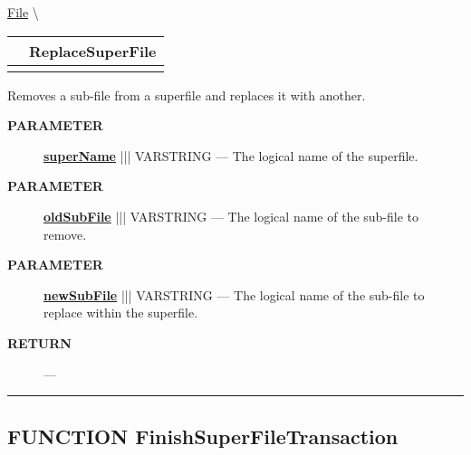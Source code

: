 \hypertarget{ecldoc:file.replacesuperfile}{}
\hspace{0pt} \hyperlink{ecldoc:File}{File} \textbackslash 

{\renewcommand{\arraystretch}{1.5}
\begin{tabularx}{\textwidth}{|>{\raggedright\arraybackslash}l|X|}
\hline
\hspace{0pt}\mytexttt{\color{red} } & \textbf{ReplaceSuperFile} \\
\hline
\multicolumn{2}{|>{\raggedright\arraybackslash}X|}{\hspace{0pt}\mytexttt{\color{param} (varstring superName, varstring oldSubFile, varstring newSubFile)}} \\
\hline
\end{tabularx}
}

\par





Removes a sub-file from a superfile and replaces it with another.






\par
\begin{description}
\item [\colorbox{tagtype}{\color{white} \textbf{\textsf{PARAMETER}}}] \textbf{\underline{superName}} ||| VARSTRING --- The logical name of the superfile.
\item [\colorbox{tagtype}{\color{white} \textbf{\textsf{PARAMETER}}}] \textbf{\underline{oldSubFile}} ||| VARSTRING --- The logical name of the sub-file to remove.
\item [\colorbox{tagtype}{\color{white} \textbf{\textsf{PARAMETER}}}] \textbf{\underline{newSubFile}} ||| VARSTRING --- The logical name of the sub-file to replace within the superfile.
\end{description}







\par
\begin{description}
\item [\colorbox{tagtype}{\color{white} \textbf{\textsf{RETURN}}}] \textbf{} --- 
\end{description}




\rule{\linewidth}{0.5pt}
\subsection*{\textsf{\colorbox{headtoc}{\color{white} FUNCTION}
FinishSuperFileTransaction}}

